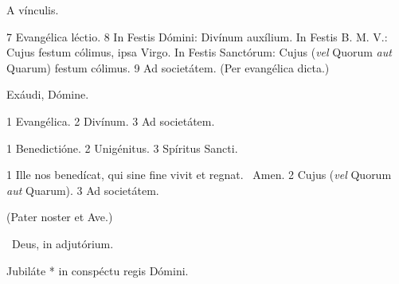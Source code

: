 
 A vínculis.

 7 Evangélica léctio. 8 In Festis Dómini: Divínum auxílium. In Festis B. M. V.: Cujus festum cólimus, ipsa Virgo. In Festis Sanctórum: Cujus (\textit{vel} Quorum \textit{aut} Quarum) festum cólimus. 9 Ad societátem. (Per evangélica dicta.)


 Exáudi, Dómine.


 1 Evangélica. 2 Divínum. 3 Ad societátem.


 1 Benedictióne. 2 Unigénitus. 3 Spíritus Sancti.


 1 Ille nos benedícat, qui sine fine vivit et regnat. \R\ Amen. 2 Cujus (\textit{vel} Quorum \textit{aut} Quarum). 3 Ad societátem.



(Pater noster et Ave.)

\V\ Deus, in adjutórium.

 Jubiláte * in conspéctu regis Dómini.


